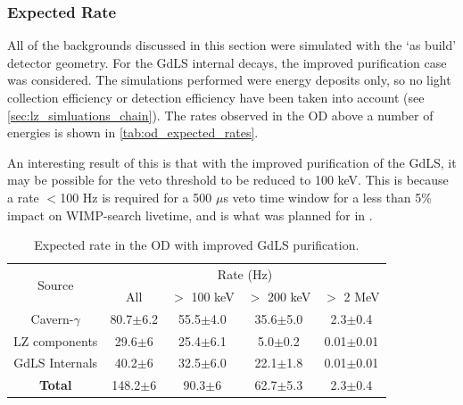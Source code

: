 \subsubsection{Expected Rate}
\par
All of the backgrounds discussed in this section were simulated with the `as build' detector geometry.
For the GdLS internal decays, the improved purification case was considered.
The simulations performed were energy deposits only, so no light collection efficiency or detection efficiency have been taken into account (see \autoref{sec:lz_simluations_chain}).
The rates observed in the OD above a number of energies is shown in \autoref{tab:od_expected_rates}.

\par
An interesting result of this is that with the improved purification of the GdLS, it may be possible for the veto threshold to be reduced to 100 keV.
This is because a rate $<$100 Hz is required for a 500 $\mu$s veto time window for a less than 5\% impact on WIMP-search livetime, and is what was planned for in \cite{LZ_TechnicalDesignReview_ref}.

\begin{table}[]
    \centering
    \begin{tabular}{c|c|c|c|c} %
    \hline
    \multirow{2}{*}{Source} & \multicolumn{4}{c}{Rate (Hz)} \\
                            & All          & $>$ 100 keV   & $>$ 200 keV   & $>$ 2 MeV \\ \hline
    Cavern-$\gamma$         & 80.7$\pm$6.2 & 55.5$\pm$4.0  & 35.6$\pm$5.0  & 2.3$\pm$0.4     \\
    LZ components           & 29.6$\pm$6   & 25.4$\pm$6.1  & 5.0$\pm$0.2   & 0.01$\pm$0.01   \\
    GdLS Internals          & 40.2$\pm$6   & 32.5$\pm$6.0  & 22.1$\pm$1.8  & 0.01$\pm$0.01   \\ \hline
    \textbf{Total}          & 148.2$\pm$6  & 90.3$\pm$6    & 62.7$\pm$5.3  & 2.3$\pm$0.4      \\ \hline
    \end{tabular}
    \caption{Expected rate in the OD with improved GdLS purification.}
    \label{tab:od_expected_rates}
\end{table} 




